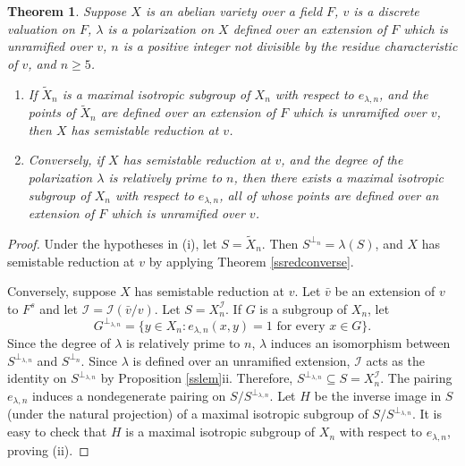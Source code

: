 \documentclass{amsart}
\def\I{{\mathcal I}}
\newtheorem{thm}{Theorem}[section]
\theoremstyle{definition}
\begin{document}
\begin{thm}
\label{ssred}
Suppose $X$ is an abelian variety over a field $F$, $v$ is a discrete 
valuation on $F$, $\lambda$ is a polarization on $X$ defined over
an extension of $F$ which is unramified over $v$, 
$n$ is a positive integer not 
divisible by the residue characteristic of $v$, and $n \ge 5$.
\begin{enumerate} 
\item[{(i)}]
If $\widetilde{X}_n$ is a maximal isotropic subgroup of $X_n$ with 
respect to $e_{\lambda,n}$, and the points of 
$\widetilde{X}_n$ are defined over an extension of $F$ which is 
unramified over $v$, then $X$ has semistable reduction at $v$.
\item[{(ii)}] Conversely, if $X$ has semistable reduction at $v$,
and the degree of the polarization $\lambda$ is relatively prime
to $n$, then there exists a maximal isotropic subgroup
of $X_n$ with respect to $e_{\lambda,n}$, all of
whose points are defined over an extension 
of $F$ which is unramified over $v$.
\end{enumerate}
\end{thm}

\begin{proof}
Under the hypotheses in (i),
let $S = \widetilde{X}_n$. Then $S^{\perp_n} = \lambda(S)$, and
$X$ has semistable reduction at $v$ by applying 
Theorem \ref{ssredconverse}.

Conversely, suppose $X$ has semistable reduction at $v$. Let
${\bar v}$ be an extension of $v$ to $F^s$ and let 
$\I = \I({\bar v}/v)$. Let $S = X_n^\I$. If $G$ is a subgroup of
$X_n$, let
$$G^{\perp_{\lambda,n}} = 
\{ y \in X_n : e_{\lambda,n}(x,y) = 1 \text{ for every } x \in G \}.$$
Since the degree of $\lambda$ is relatively prime to $n$, 
$\lambda$ induces an isomorphism between $S^{\perp_{\lambda,n}}$
and $S^{\perp_n}$. Since $\lambda$ is defined over an unramified
extension, $\I$ acts as the identity on $S^{\perp_{\lambda,n}}$
by Proposition \ref{sslem}ii. Therefore, 
$S^{\perp_{\lambda,n}} \subseteq S = X_n^\I$. 
The pairing $e_{\lambda,n}$ induces a nondegenerate pairing on
$S/S^{\perp_{\lambda,n}}$. Let $H$ be the inverse image
in $S$ (under the natural projection) of a maximal isotropic 
subgroup of $S/S^{\perp_{\lambda,n}}$. It is easy to check that 
$H$ is a maximal isotropic subgroup of $X_n$ with respect
to $e_{\lambda,n}$, proving (ii).  
\end{proof}
\end{document}
